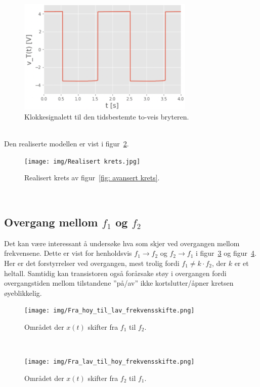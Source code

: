 \documentclass[a4paper,11pt,norsk]{article}
\begin{document}
\newpage
\begin{figure}[!htbp]
    \centering
    \includegraphics[width=0.75\textwidth]{img/Klokkesignal.png}
    \caption{Klokkesignalett til den tidsbestemte to-veis bryteren.}
    \label{fig: scope klokkesignal}
\end{figure} \\
Den realiserte modellen er vist i figur~\ref{fig: realisert modell}.
\begin{figure}[!htbp]
    \centering
    \texttt{[image: img/Realisert krets.jpg]}
    \caption{Realisert krets av figur~\ref{fig: avansert krets}.}
    \label{fig: realisert modell}
\end{figure} \\

\subsection{Overgang mellom $f_1$ og $f_2$}
Det kan være interessant å undersøke hva som skjer ved overgangen mellom frekvensene. Dette er vist for henholdsvis $f_1\rightarrow f_2$ og $f_2 \rightarrow f_1$ i figur~\ref{fig: f_1 til f_2 frekvensskifte} og figur~\ref{fig: f_2 til f_1 frekvensskifte}.
Her er det forstyrrelser ved overgangen, mest trolig fordi $f_1 \neq k \cdot f_2$, der $k$ er et heltall. Samtidig kan transistoren også forårsake støy i overgangen fordi overgangstiden mellom tilstandene ''på/av'' ikke kortslutter/åpner kretsen øyeblikkelig. \\
\begin{figure}[!htbp]
    \centering
    \texttt{[image: img/Fra\_hoy\_til\_lav\_frekvensskifte.png]}
    \caption{Området der $x(t)$ skifter fra $f_1$ til $f_2$.}
    \label{fig: f_1 til f_2 frekvensskifte}
\end{figure} \\
\begin{figure}[!htbp]
    \centering
    \texttt{[image: img/Fra\_lav\_til\_hoy\_frekvensskifte.png]}
    \caption{Området der $x(t)$ skifter fra $f_2$ til $f_1$.}
    \label{fig: f_2 til f_1 frekvensskifte}
\end{figure} \\
\newpage
\end{document}
